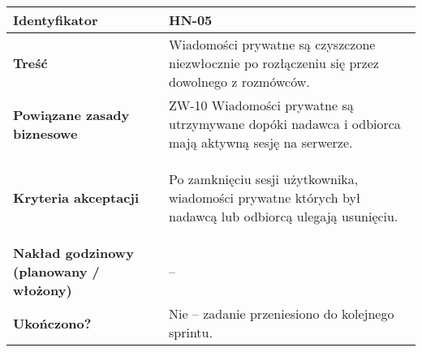 \begin{tabular}{ | l | l | }
	\hline
		\textbf{Identyfikator} &
		HN-05
		\\

	\hline
		\textbf{Treść} & \parbox[t]{11.5cm}{\strut
			Wiadomości prywatne są czyszczone niezwłocznie po rozłączeniu się przez dowolnego z rozmówców.
		\strut}\\

	\hline
		\parbox[t]{4cm}{\textbf{Powiązane zasady biznesowe}} & \parbox[t]{11.5cm}{\strut
			ZW-10 Wiadomości prywatne są utrzymywane dopóki nadawca i odbiorca mają aktywną sesję na serwerze.
		\strut}\\

	\hline
		\parbox[t]{4cm}{\textbf{Kryteria akceptacji}} & \parbox[t]{11.5cm}{\strut
			\begin{enumreq}
				\item Po zamknięciu sesji użytkownika, wiadomości prywatne których był nadawcą lub odbiorcą ulegają
        usunięciu.
			\end{enumreq}
			\strut}
		\\

	\hline
  \parbox[t]{4cm}{\textbf{Nakład godzinowy (planowany / włożony)}} &
  \parbox[t]{11.5cm}{\strut
   --
  \strut}\\

  \hline
    \parbox[t]{4cm}{\textbf{Ukończono?}} &
    \parbox[t]{11.5cm}{\strut
      Nie -- zadanie przeniesiono do kolejnego sprintu.
    \strut}\\
\hline
\end{tabular}

\vspace{1em}

